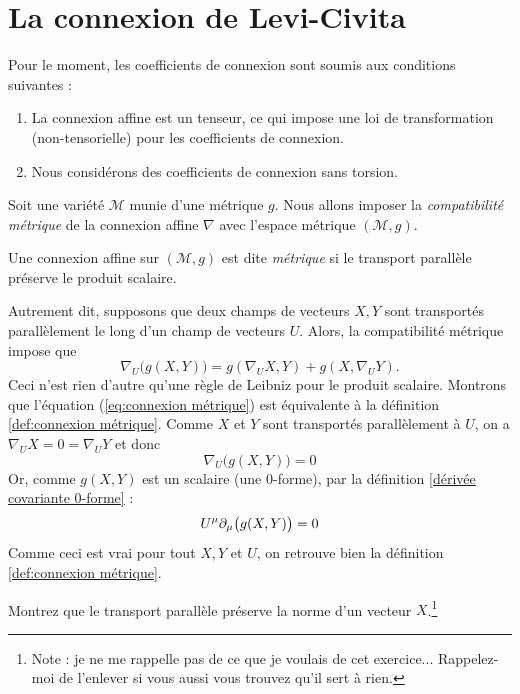 \section{La connexion de Levi-Civita}
Pour le moment, les coefficients de connexion sont soumis aux conditions suivantes :
\begin{enumerate}
    \item La connexion affine est un tenseur, ce qui impose une loi de transformation (non-tensorielle) pour les coefficients de connexion.
    \item Nous considérons des coefficients de connexion sans torsion.
\end{enumerate}
Soit une variété $\mathcal{M}$ munie d'une métrique $g$. Nous allons imposer la \emph{compatibilité métrique} de la connexion affine $\nabla$ avec l'espace métrique $(\mathcal{M},g)$.
\begin{theoremframe}
    \begin{defi}
        \label{def:connexion métrique}
        Une connexion affine sur $(\mathcal{M},g)$ est dite \emph{métrique} si le transport parallèle préserve le produit scalaire.
    \end{defi}
\end{theoremframe}
Autrement dit, supposons que deux champs de vecteurs $X,Y$ sont transportés parallèlement le long d'un champ de vecteurs $U$. Alors, la compatibilité métrique impose que
\begin{equation}
\label{eq:connexion métrique}
    \nabla_U \big(g(X, Y)\big) = g(\nabla_U X, Y) + g(X, \nabla_U Y).
\end{equation}
Ceci n'est rien d'autre qu'une règle de Leibniz pour le produit scalaire. Montrons que l'équation (\ref{eq:connexion métrique}) est équivalente à la 
définition \ref{def:connexion métrique}. Comme $X$ et $Y$ sont transportés parallèlement à $U$, on a $\nabla_U X = 0 = \nabla_U Y$ et donc 
\begin{equation}
    \nabla_U \big(g(X, Y)\big) = 0
\end{equation}
Or, comme $g(X, Y)$ est un scalaire (une 0-forme), par la définition \ref{dérivée covariante 0-forme} :
\begin{equation}
    U^\mu \partial_\mu \big(g(X, Y)\big) = 0
\end{equation}
Comme ceci est vrai pour tout $X,Y$ et $U$, on retrouve bien la définition \ref{def:connexion métrique}.
\begin{exerc}
    Montrez que le transport parallèle préserve la norme d'un vecteur $X$.\footnote{Note : je ne me rappelle pas de ce que je voulais de cet exercice... Rappelez-moi de l'enlever si vous aussi vous trouvez qu'il sert à rien.}
\end{exerc}
